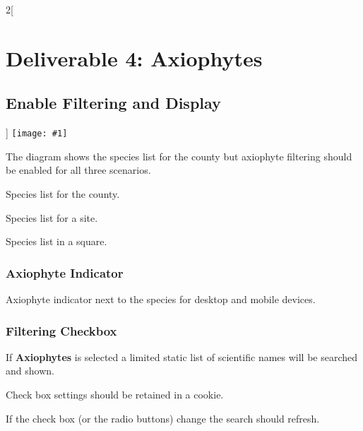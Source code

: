 \documentclass[a4paper,12pt,landscape]{article}
\newcommand{\wireframe}[1]{\texttt{[image: \#1]}\clearpage}
\begin{document}
\begin{multicols*}{2}[%
  \section{Deliverable 4: Axiophytes}%
  \subsection{Enable Filtering and Display}%
]
\thispagestyle{empty}
\wireframe{./wireframes/Species__ListForCountyAxiophytes.png}%

The diagram shows the species list for the county but
axiophyte filtering should be enabled for all three scenarios.

\begin{todolist}
  \item Species list for the county.
  \item Species list for a site.
  \item Species list in a square.
\end{todolist}

\subsubsection*{Axiophyte Indicator}

\begin{todolist}
  \item Axiophyte indicator next to the species for desktop and mobile devices.
\end{todolist}

\subsubsection*{Filtering Checkbox}

\begin{todolist}
  \item If \textbf{Axiophytes} is selected a limited static list of scientific names will be searched and shown.
  \item Check box settings should be retained in a cookie.
  \item If the check box (or the radio buttons) change the search should refresh.
\end{todolist}


\clearpage
\end{multicols*}

\end{document}

